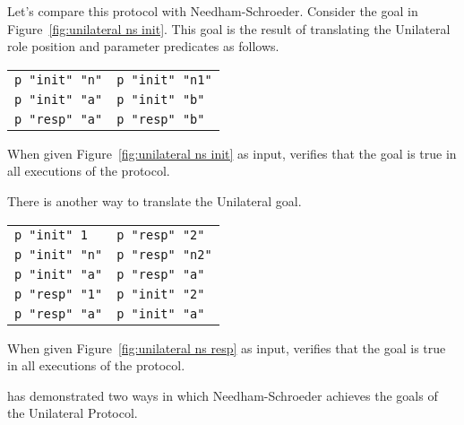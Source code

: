 \documentclass[12pt]{article}
\begin{document}
Let's compare this protocol with Needham-Schroeder.  Consider the goal
in Figure~\ref{fig:unilateral ns init}.  This goal is the result of
translating the Unilateral role position and parameter predicates as
follows.
\begin{center}
\begin{tabular}{l@{$\quad\rightarrow\quad$}l}
  \texttt{p "init" "n"}&\texttt{p "init" "n1"}\\
  \texttt{p "init" "a"}&\texttt{p "init" "b"}\\
  \texttt{p "resp" "a"}&\texttt{p "resp" "b"}
\end{tabular}
\end{center}
When given Figure~\ref{fig:unilateral ns init} as input, {\cpsa}
verifies that the goal is true in all executions of the protocol.

There is another way to translate the Unilateral goal.
\begin{center}
\begin{tabular}{l@{$\quad\rightarrow\quad$}l}
  \texttt{p "init" 1}&\texttt{p "resp" "2"}\\
  \texttt{p "init" "n"}&\texttt{p "resp" "n2"}\\
  \texttt{p "init" "a"}&\texttt{p "resp" "a"}\\
  \texttt{p "resp" "1"}&\texttt{p "init" "2"}\\
  \texttt{p "resp" "a"}&\texttt{p "init" "a"}
\end{tabular}
\end{center}
When given Figure~\ref{fig:unilateral ns resp} as input, {\cpsa}
verifies that the goal is true in all executions of the protocol.

{\cpsa} has demonstrated two ways in which Needham-Schroeder achieves
the goals of the Unilateral Protocol.



\end{document}
